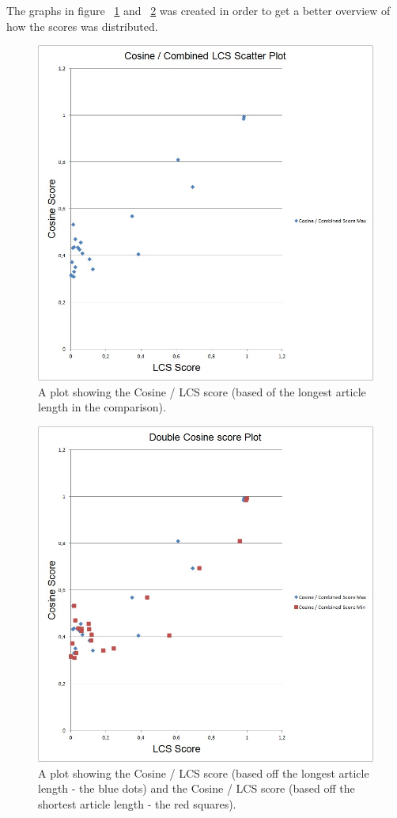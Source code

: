 The graphs in figure ~\ref{MaxScore} and ~\ref{MinScore} was created in order to get a better overview of how the scores was distributed. 

\begin{figure}
	\centering
	\includegraphics[scale=0.5]{figures/JPPOLCosineLCSMax}
	\caption{A plot showing the Cosine / LCS score (based of the longest article length in the comparison).}
	\label{MaxScore}
\end{figure}

\begin{figure}
	\centering
	\includegraphics[scale=0.5]{figures/JPPOLCosineLCSMin}
	\caption{A plot showing the Cosine / LCS score (based off the longest article length - the blue dots) and the Cosine / LCS score (based off the shortest article length - the red squares).}
		\label{MinScore}
\end{figure}

